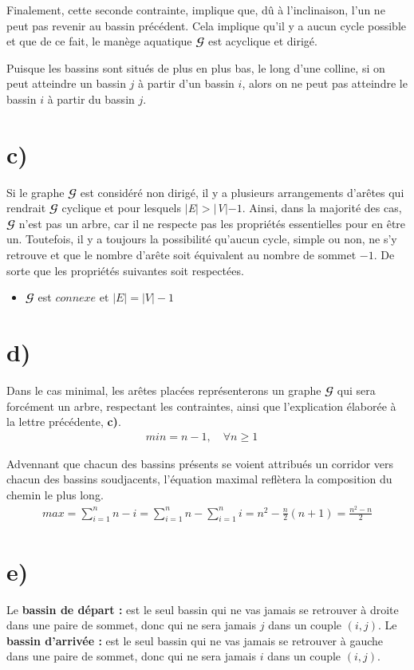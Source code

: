 \documentclass[11pt,a4paper, oneside, oldfontcommands]{memoir}
\newcommand{\G}{$\mathbfcal{G}$}
\newcommand{\V}{$\textit{V}$}
\newcommand{\E}{$\textit{E}$}
\begin{document}
  Finalement, cette seconde contrainte, implique que, dû à l'inclinaison, l'un ne peut pas revenir au bassin précédent. Cela implique qu'il y a aucun cycle possible et que de ce fait, le manège aquatique \G{} est acyclique et dirigé.
  \begin{siderules}
    Puisque les bassins sont situés de plus en plus bas, le long d'une colline, si on peut atteindre un bassin $j$ à partir d'un bassin $i$, alors on ne peut pas atteindre le bassin $i$ à partir du bassin $j$.
  \end{siderules}


\section{c)}
Si le graphe \G{} est considéré non dirigé, il y a plusieurs arrangements d'arêtes qui rendrait \G{} cyclique et pour lesquels $|\E{}| > |\V{}| - 1$.
Ainsi, dans la majorité des cas, \G{} n'est pas un arbre, car il ne respecte pas les propriétés essentielles pour en être un.
Toutefois, il y a toujours la possibilité qu'aucun cycle, simple ou non, ne s'y retrouve et que le nombre d'arête soit équivalent au nombre de sommet $- 1$.
De sorte que les propriétés suivantes soit respectées.

  \BlankLine
  \begin{itemize}
    \item\G{} est $connexe$ et $|\textit{E}| = |\textit{V}| - 1$
  \end{itemize} 

\section{d)}
Dans le cas minimal, les arêtes placées représenterons un graphe \G{} qui sera forcément un arbre, respectant les contraintes, ainsi que l'explication élaborée à la lettre précédente, \textbf{c)}.
\begin{gather*}
  min = n-1,\quad \forall n \geq 1\quad
\end{gather*}

Advennant que chacun des bassins présents se voient attribués un corridor vers chacun des bassins soudjacents, l'équation maximal reflètera la composition du chemin le plus long. 
\begin{gather*}
  max = \sum_{i=1}^{n} {n-i}=\sum_{i=1}^{n} {n}-\sum_{i=1}^{n} {i}=n^{2}-\frac{n}{2}(n+1)=\frac{n^{2}-n}{2}
\end{gather*}

\section{e)}
  Le \textbf{bassin de départ :} est le seul bassin qui ne vas jamais se retrouver à droite dans une paire de sommet, donc qui ne sera jamais $j$ dans un couple $(i,j)$.
  \BlankLine
  Le \textbf{bassin d'arrivée :} est le seul bassin qui ne vas jamais se retrouver à gauche dans une paire de sommet, donc qui ne sera jamais $i$ dans un couple $(i,j)$.
\end{document}
